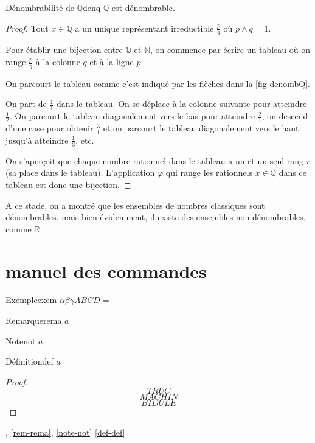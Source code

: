 \documentclass[a4paper,french,final]{memoir}
\begin{document}
\begin{theoremb}{Dénombrabilité de $\mathbb{Q}$}{denq}
	$\mathbb{Q}$ est dénombrable.
\end{theoremb}

\begin{proof}
	Tout $x \in \mathbb{Q}$ a un unique représentant irréductible $\frac{p}{q}$ où $p \wedge q = 1$. 
	
	Pour établir une bijection entre $\mathbb{Q}$ et $\mathbb{N}$, on commence par écrire un tableau où on range $\frac{p}{q}$ à la colonne $q$ et à la ligne $p$.  
	
	On parcourt le tableau comme c'est indiqué par les flèches dans la \cref{fig-denombQ}. 
	
	On part de $\frac{1}{1}$ dans le tableau. On se déplace à la colonne suivante pour atteindre $\frac{1}{2}$. On parcourt le tableau diagonalement vers le bas pour atteindre $\frac{2}{1}$, on descend d'une case pour obtenir $\frac{3}{1}$ et on parcourt le tableau diagonalement vers le haut jusqu'à atteindre $\frac{1}{3}$, etc. 
	
	On s'aperçoit que chaque nombre rationnel dans le tableau a un et un seul rang $r$ (sa place dans le tableau). L'application $\varphi$ qui range les rationnels $x \in \mathbb{Q}$ dans ce tableau est donc une bijection.
	
	 
\end{proof}
\diagdenomb

A ce stade, on a montré que les ensembles de nombres classiques sont dénombrables, mais bien évidemment, il existe des ensembles non dénombrables, comme $\mathbb{R}$. 


\backmatter
\nocite{*}
\printbibliography
\appendix
\chapter{manuel des commandes}
\begin{theoremb}{Exemple}{exem}
\(\alpha\beta\gamma ABCD=\)
\end{theoremb}
\begin{remarkb}{Remarque}{rema}
\(a\)
\end{remarkb}
\begin{noteb}{Note}{not}
$a$
\end{noteb}
\begin{defb}{Définition}{def}
$a$
\end{defb}
\begin{proof}
\makeatletter
{}
\[TRUC\]
\proofpart{}
\[MACHIN\]
\[BIDULE\]
\end{proof}
, \cref{rem-rema}, \cref{note-not} \cref{def-def} 
\end{document}
